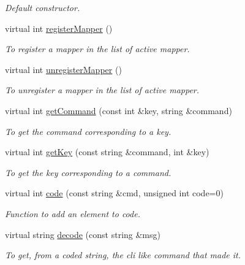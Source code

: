 \begin{DoxyCompactItemize}
\begin{DoxyCompactList}\small\item\em Default constructor. \item\end{DoxyCompactList}\item 
virtual int \hyperlink{classFMSMapper_a9bc0c707f78b3b77bd5e12c2adca8b3c}{registerMapper} ()
\begin{DoxyCompactList}\small\item\em To register a mapper in the list of active mapper. \item\end{DoxyCompactList}\item 
virtual int \hyperlink{classFMSMapper_a6d775c27ca0443e6969c857eb2b87377}{unregisterMapper} ()
\begin{DoxyCompactList}\small\item\em To unregister a mapper in the list of active mapper. \item\end{DoxyCompactList}\item 
virtual int \hyperlink{classFMSMapper_aee31b7ad546a67dab0c5e6309fbfd829}{getCommand} (const int \&key, string \&command)
\begin{DoxyCompactList}\small\item\em To get the command corresponding to a key. \item\end{DoxyCompactList}\item 
virtual int \hyperlink{classFMSMapper_ae325ab9b7dedff767c751a57cde29159}{getKey} (const string \&command, int \&key)
\begin{DoxyCompactList}\small\item\em To get the key corresponding to a command. \item\end{DoxyCompactList}\item 
virtual int \hyperlink{classFMSMapper_a51fbbdc957501c96dba021a8882bb50f}{code} (const string \&cmd, unsigned int code=0)
\begin{DoxyCompactList}\small\item\em Function to add an element to code. \item\end{DoxyCompactList}\item 
virtual string \hyperlink{classFMSMapper_ab7b4f97dba156d89c59e0fc4ddaf4fa3}{decode} (const string \&msg)
\begin{DoxyCompactList}\small\item\em To get, from a coded string, the cli like command that made it. \item\end{DoxyCompactList}\end{DoxyCompactItemize}

